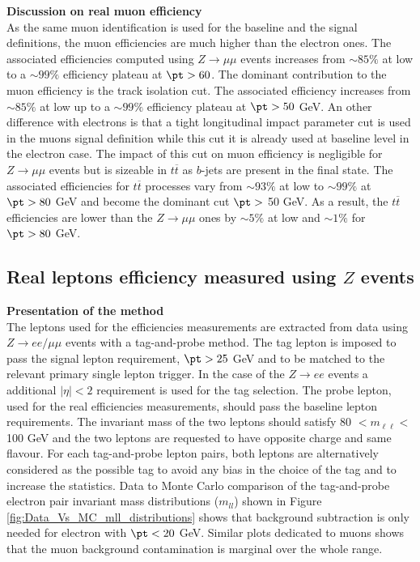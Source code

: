 	\par{\bf Discussion on real muon efficiency \\}
        As the same muon identification is used for the baseline and the signal definitions, the muon efficiencies are much higher than the electron ones. The associated efficiencies computed using $Z\rightarrow\mu\mu$ events increases from $\sim 85\%$ at low \pt to a $\sim 99\%$ efficiency plateau at $\pt > 60$. The dominant contribution to the muon efficiency is the track isolation cut. The associated efficiency increases from $\sim 85\%$ at low \pt up to a $\sim 99\%$ efficiency plateau at $\pt > 50$ GeV. An other difference with electrons is that a tight longitudinal impact parameter cut is used in the muons signal definition while this cut it is already used at baseline level in the electron case. The impact of this cut on muon efficiency is negligible for $Z\rightarrow\mu\mu$ events but is sizeable in $t\overline{t}$ as $b$-jets are present in the final state. The associated efficiencies for $t\overline{t}$ processes vary from $\sim 93\%$ at low \pt to $\sim 99\%$ at $\pt > 80$ GeV and become the dominant cut $\pt >$ 50 GeV. As a result, the $t\overline{t}$ efficiencies are lower than the $Z\rightarrow\mu\mu$ ones by $\sim 5\%$ at low \pt and $\sim 1\%$ for $\pt > 80$ GeV.


	
	\subsection{Real leptons efficiency measured using $Z$ events}  
	\label{App:RealEff_Z_TandP}
\par{\bf Presentation of the method \\}
         The leptons used for the efficiencies measurements are extracted from data using $Z\rightarrow ee/\mu\mu$ events with a tag-and-probe method. The tag lepton is imposed to pass the signal lepton requirement, $\pt > 25$ GeV and to be matched to the relevant primary single lepton trigger. In the case of the $Z\rightarrow ee$ events a additional $|\eta| < 2$ requirement is used for the tag selection. The probe lepton, used for the real efficiencies measurements, should pass the baseline lepton requirements. The invariant mass of the two leptons should satisfy 80 $ < m_{\ell\ell} < $ 100 GeV and the two leptons are requested to have opposite charge and same flavour. For each tag-and-probe lepton pairs, both leptons are alternatively considered as the possible tag to avoid any bias in the choice of the tag and to increase the statistics. Data to Monte Carlo comparison of the tag-and-probe electron pair invariant mass distributions ($m_{ll}$) shown in Figure \ref{fig:Data_Vs_MC_mll_distributions} shows that background subtraction is only needed for electron with $\pt < 20$ GeV. Similar plots dedicated to muons shows that the muon background contamination is marginal over the whole \pt range.\\


